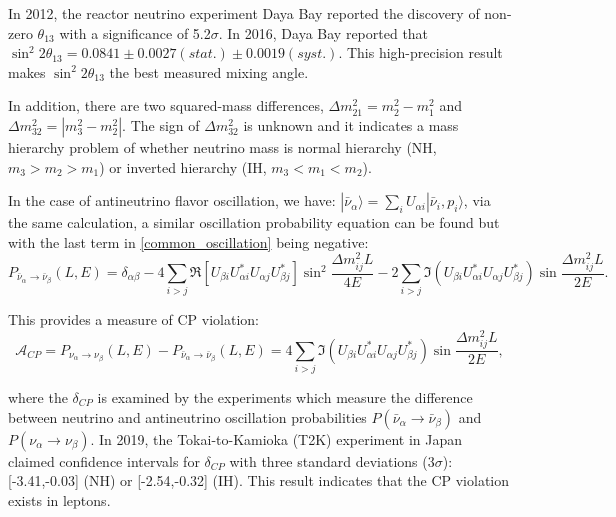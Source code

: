 In 2012, the reactor neutrino experiment Daya Bay reported the discovery of non-zero $\theta_{13}$ with a significance of 5.2$\sigma$. In 2016, Daya Bay reported that $\sin^2 2\theta_{13} = 0.0841\pm0.0027(stat.)\pm0.0019(syst.)$. This high-precision result makes $\sin^2 2\theta_{13}$ the best measured mixing angle\cite{an2017measurement,qian2019physics}.

In addition, there are two squared-mass differences, $\Delta m^2_{21}=m_2^2-m_1^2$ and $\Delta m^2_{32}=|m_3^2-m_2^2|$. The sign of $\Delta m^2_{32}$ is unknown and it indicates a mass hierarchy problem of whether neutrino mass is normal hierarchy (NH, $m_3>m_2>m_1$) or inverted hierarchy (IH, $m_3<m_1<m_2$)\cite{pdg2020}. 

In the case of antineutrino flavor oscillation, we have: $|\bar{\nu}_\alpha\rangle=\sum_i U_{\alpha i}|\bar{\nu}_i,p_i\rangle$, via the same calculation, a similar oscillation probability equation can be found but with the last term in \ref{common_oscillation} being negative\cite{aitchison2012gauge}:
\begin{equation}\label{antiNu_eq1}
P_{\bar{\nu}_\alpha\to\bar{\nu}_\beta}(L,E)=\delta_{\alpha\beta}-4\sum_{i>j} \Re[U_{\beta i}U^*_{\alpha i}U_{\alpha j}U^*_{\beta j}]\sin^2\frac{\Delta m^2_{ij}L}{4E}-2\sum_{i>j} \Im(U_{\beta i}U^*_{\alpha i}U_{\alpha j}U^*_{\beta j})\sin\frac{\Delta m^2_{ij}L}{2E}.
\end{equation}

This provides a measure of CP violation\cite{aitchison2012gauge}:
\begin{equation}\label{cpV_eq1}
\mathcal{A}_{CP}=P_{\nu_\alpha\to\nu_\beta}(L,E)-P_{\bar{\nu}_\alpha\to\bar{\nu}_\beta}(L,E)=
4\sum_{i>j} \Im(U_{\beta i}U^*_{\alpha i}U_{\alpha j}U^*_{\beta j})\sin\frac{\Delta m^2_{ij}L}{2E},
\end{equation}

where the $\delta_{CP}$ is examined by the experiments which measure the difference between neutrino and antineutrino oscillation probabilities $P(\bar{\nu}_\alpha\to\bar{\nu}_\beta)$ and $P(\nu_\alpha\to\nu_\beta)$\cite{xing2011neutrinos}. In 2019, the Tokai-to-Kamioka (T2K) experiment in Japan claimed confidence intervals for $\delta_{CP}$ with three standard deviations ($3\sigma$): [-3.41,-0.03] (NH) or [-2.54,-0.32] (IH). This result indicates that the CP violation exists in leptons\cite{abe2019constraint}.


